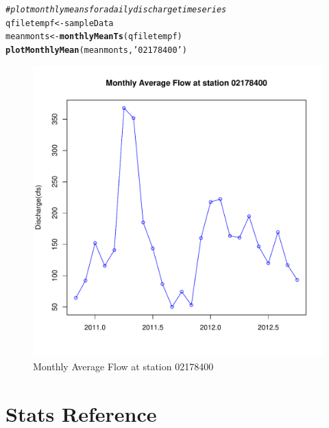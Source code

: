 \documentclass[a4paper,11pt]{article}\usepackage[]{graphicx}\usepackage[]{color}
\makeatletter
\def\maxwidth{ %
  \ifdim\Gin@nat@width>\linewidth
    \linewidth
  \else
    \Gin@nat@width
  \fi
}
\newcommand{\hlstr}[1]{\textcolor[rgb]{0.192,0.494,0.8}{#1}}%
\newcommand{\hlcom}[1]{\textcolor[rgb]{0.678,0.584,0.686}{\textit{#1}}}%
\newcommand{\hlstd}[1]{\textcolor[rgb]{0.345,0.345,0.345}{#1}}%
\newcommand{\hlkwb}[1]{\textcolor[rgb]{0.69,0.353,0.396}{#1}}%
\newcommand{\hlkwd}[1]{\textcolor[rgb]{0.737,0.353,0.396}{\textbf{#1}}}%
\newenvironment{kframe}{%
 \def\at@end@of@kframe{}%
 \ifinner\ifhmode%
  \def\at@end@of@kframe{\end{minipage}}%
  \begin{minipage}{\columnwidth}%
 \fi\fi%
 \def\FrameCommand##1{\hskip\@totalleftmargin \hskip-\fboxsep
 \colorbox{shadecolor}{##1}\hskip-\fboxsep
     \hskip-\linewidth \hskip-\@totalleftmargin \hskip\columnwidth}%
 \MakeFramed {\advance\hsize-\width
   \@totalleftmargin\z@ \linewidth\hsize
   \@setminipage}}%
 {\par\unskip\endMakeFramed%
 \at@end@of@kframe}
\newenvironment{knitrout}{}{} %
\makeatother
\begin{document}
\begin{knitrout}
\color{fgcolor}\begin{kframe}
\begin{alltt}
\hlcom{# plot monthly means for a daily discharge timeseries}
\hlstd{qfiletempf}\hlkwb{<-}\hlstd{sampleData}
\hlstd{meanmonts}\hlkwb{<-}\hlkwd{monthlyMeanTs}\hlstd{(qfiletempf)}
\hlkwd{plotMonthlyMean}\hlstd{(meanmonts,}\hlstr{'02178400'}\hlstd{)}
\end{alltt}
\end{kframe}\begin{figure}[]

\includegraphics[width=\maxwidth]{figure/plotMonthlyMeans} \caption[Monthly Average Flow at station 02178400]{Monthly Average Flow at station 02178400\label{fig:plotMonthlyMeans}}
\end{figure}


\end{knitrout}

\FloatBarrier

\section{Stats Reference}
\label{sec:reference}
\end{document}
